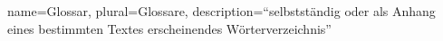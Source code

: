 {
    name=Glossar,
    plural=Glossare,
    description={\enquote{selbstständig oder als Anhang eines bestimmten Textes erscheinendes Wörterverzeichnis} \cite{Duden}}
}